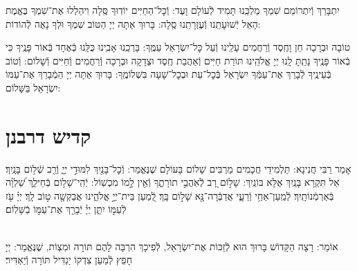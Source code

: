 \documentclass[twoside, openany, parskip=half, 11pt]{book}
\begin{document}
\nextpage

יִתְבָּרַךְ וְֿיִתְרוֹמַם שִׁמְךָ מַלְכֵּֽנוּ תָּמִיד לְֿעוֹלָם וָעֶד:
וְֿכׇל־הַחַיִּים יוֹדֽוּךָ סֶּֽלָה וִיהַלְלוּ אֶת־שִׁמְךָ בֶּאֱמֶת הָאֵל יְֿשׁוּעָתֵֽנוּ וְֿעֶזְרָתֵֽנוּ סֶֽלָה: בָּרוּךְ אַתָּה יְיָ הַטּוֹב שִׁמְךָ וּלְךָ נָאֶה לְֿהוֹדוֹת:

\shatzbrikaskohanim

טוֹבָה וּבְרָכָה חֵן וָחֶֽסֶד וְֿרַחֲמִים עָלֵֽינוּ וְֿעַל כׇּל־יִשְׂרָאֵל עַמֶּֽךָ: בָּרְכֵֽנוּ אָבִֽינוּ כֻּלָּֽנוּ כְּֿאֶחָד בְּֿאוֹר פָּנֶֽיךָ כִּי בְֿאוֹר פָּנֶֽיךָ נָתַֽתָּ לָֽנוּ יְיָ אֱלֹהֵֽינוּ תּוֹרַת חַיִּים וְֿאַהֲבַת חֶֽסֶד וּצְדָקָה וּבְרָכָה וְֿרַחֲמִים וְֿחַיִּים וְֿשָׁלוֹם: וְֿטוֹב בְּֿעֵינֶֽיךָ לְֿבָרֵךְ אֶת־עַמְּֿךָ יִשְׂרָאֵל בְּֿכׇל־עֵת וּבְכׇל־שָׁעָה בִּשְׁלוֹמֶֽךָ: בָּרוּךְ אַתָּה יְיָ הַמְֿבָרֵךְ אֶת־עַמּוֹ יִשְׂרָאֵל בַּשָּׁלוֹם:

\tachanunim

\fullkaddish

\aleinu

\mournerskaddish


\chapter[קדיש דרבנן]{ קדיש דרבנן }
\label{kaddish derabonan}


אָמַר רַבִּי חֲנִינָא: תַּלְמִידֵי חֲכָמִים מַרְבִּים שָׁלוֹם בָּעוֹלָם שֶׁנֶּאֱמַר: וְֿכׇל־בָּנַ֖יִךְ לִמּוּדֵ֣י יְיָ֑ וְֿרַ֖ב שְֿׁל֥וֹם בָּנָֽיִךְ׃ אַל תִּקְרָא בָּנַֽיִךְ אֶלָּא בּוֹנַֽיִךְ: שָׁל֣וֹם רָ֭ב לְֿאֹֽהֲבֵ֣י תוֹרָתֶ֑ךָ וְֿאֵ֖ין לָ֣מוֹ מִכְשֽׁוֹל: יְֿהִֽי־שָׁל֥וֹם בְּֿחֵילֵ֑ךְ שַׁ֝לְוָ֗ה בְּֿאַרְמְֿנוֹתָֽיִךְ׃ לְֿמַֽעַן־אַחַ֥י וְֿרֵעָ֑י אֲדַבְּֿרָה־נָּ֖א שָׁל֣וֹם בָּֽךְ׃ לְֿ֭מַעַן בֵּית־יְיָ֣ אֱלֹהֵ֑ינוּ אֲבַקְשָׁ֖ה ט֣וֹב לָֽךְ׃ יְיָ֗ עֹ֖ז לְֿעַמּ֣וֹ יִתֵּ֑ן יְיָ֓ יְֿבָרֵ֖ךְ אֶת־עַמּ֣וֹ בַֿשָּׁלֽוֹם׃

\\
אוֹמֵר: רָצָה הַקָּדוֹשׁ בָּרוּךְ הוּא לְֿזַכּוֹת אֶת־יִשְׂרָאֵל, לְֿפִיכָךְ הִרְבָּה לָהֶם תּוֹרָה וּמִצְוֹת, שֶׁנֶּאֱמַר:
יְיָ חָפֵץ לְֿמַעַן צִדְקוֹ יַגְדִּיל תּוֹרָה וְֿיַאְדִּיר׃


\begin{kaddish}

\rabbiskaddish
\end{kaddish}
\end{document}

